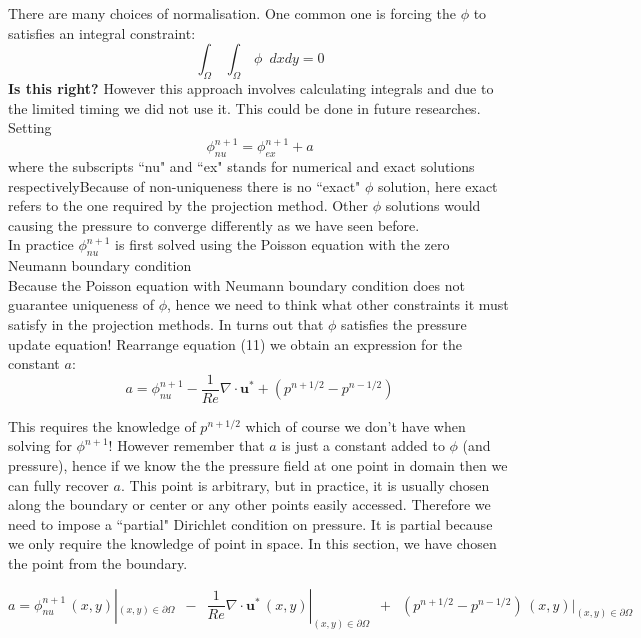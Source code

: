 There are many choices of normalisation. One common one is forcing the $\phi$ to satisfies an integral constraint:
\begin{equation}
\int_{\Omega}\,\int_{\Omega}\,\phi \,\,\, dx dy = 0
\end{equation}
\textbf{Is this right?}
However this approach involves calculating integrals and due to the limited timing we did not use it. This could be done in future researches.\\

Setting 
\begin{equation}
\phi^{n+1}_{nu} = \phi^{n+1}_{ex} + a
\end{equation}
where the subscripts ``nu" and ``ex" stands for numerical and exact solutions respectivelyBecause of non-uniqueness there is no ``exact" $\phi$ solution, here exact refers to the one required by the projection method. Other $\phi$ solutions would causing the pressure to converge differently as we have seen before.\\

In practice $\phi^{n+1}_{nu}$ is first solved using the Poisson equation with the zero Neumann boundary condition\\

Because the Poisson equation with Neumann boundary condition does not guarantee uniqueness of $\phi$, hence we need to think what other constraints it must satisfy in the projection methods. In turns out that $\phi$ satisfies the pressure update equation! Rearrange equation (11) we obtain an expression for the constant $a$:
\begin{equation}
a = \phi^{n+1}_{nu} - \dfrac{1}{Re} \nabla \cdot \textbf{u}^* + (p^{n+1/2} - p^{n-1/2})
\end{equation}

This requires the knowledge of $p^{n+1/2}$ which of course we don't have when solving for $\phi^{n+1}$! However remember that $a$ is just a constant added to $\phi$ (and pressure), hence if we know the the pressure field at one point in domain then we can fully recover $a$. This point is arbitrary, but in practice, it is usually chosen along the boundary or center or any other points easily accessed. Therefore we need to impose a ``partial" Dirichlet condition on pressure. It is partial because we only require the knowledge of point in space. In this section, we have chosen the point from the boundary.

\begin{equation}
a = \phi^{n+1}_{nu}\,(x,y)|_{(x,y)\in \partial\Omega} \,\,\,-\,\,\, \dfrac{1}{Re} \nabla \cdot \textbf{u}^*\,(x,y)|_{(x,y)\in \partial\Omega}\,\,\, +\,\,\, (p^{n+1/2} - p^{n-1/2})\,(x,y)|_{(x,y)\in \partial\Omega}
\end{equation}

